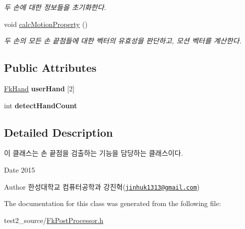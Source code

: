 \begin{DoxyCompactItemize}
\begin{DoxyCompactList}\small\item\em 두 손에 대한 정보들을 초기화한다. \end{DoxyCompactList}\item 
\hypertarget{class_fk_finger_tip_detector_a4946d6903089e79278ccf663bcc725e3}{}void \hyperlink{class_fk_finger_tip_detector_a4946d6903089e79278ccf663bcc725e3}{calc\+Motion\+Property} ()\label{class_fk_finger_tip_detector_a4946d6903089e79278ccf663bcc725e3}

\begin{DoxyCompactList}\small\item\em 두 손의 모든 손 끝점들에 대한 벡터의 유효성을 판단하고, 모션 벡터를 계산한다. \end{DoxyCompactList}\end{DoxyCompactItemize}
\subsection*{Public Attributes}
\begin{DoxyCompactItemize}
\item 
\hypertarget{class_fk_finger_tip_detector_a5b714127d6d0d37ca4bf40bd52f7e29c}{}\hyperlink{class_fk_hand}{Fk\+Hand} {\bfseries user\+Hand} \mbox{[}2\mbox{]}\label{class_fk_finger_tip_detector_a5b714127d6d0d37ca4bf40bd52f7e29c}

\item 
\hypertarget{class_fk_finger_tip_detector_a0b20588d59b911aeb794a140b96e698d}{}int {\bfseries detect\+Hand\+Count}\label{class_fk_finger_tip_detector_a0b20588d59b911aeb794a140b96e698d}

\end{DoxyCompactItemize}


\subsection{Detailed Description}
이 클래스는 손 끝점을 검출하는 기능을 담당하는 클래스이다. 

\begin{DoxyDate}{Date}
2015 
\end{DoxyDate}
\begin{DoxyAuthor}{Author}
한성대학교 컴퓨터공학과 강진혁(\href{mailto:jinhuk1313@gmail.com}{\tt jinhuk1313@gmail.\+com}) 
\end{DoxyAuthor}


The documentation for this class was generated from the following file\+:\begin{DoxyCompactItemize}
\item 
test2\+\_\+source/\hyperlink{_fk_post_processor_8h}{Fk\+Post\+Processor.\+h}\end{DoxyCompactItemize}
